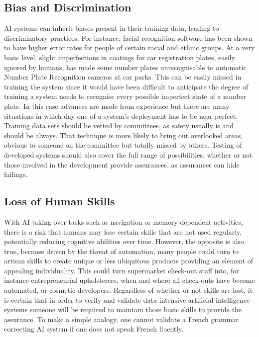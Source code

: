 \subsection{Bias and Discrimination}
AI systems can inherit biases present in their training data, leading to discriminatory practices. For instance, facial recognition software has been shown to have higher error rates for people of certain racial and ethnic groups. At a very basic level, slight imperfections in coatings for car registration plates, easily ignored by humans, has made some number plates unrecognisable to automatic Number Plate Recognition cameras at car parks. This can be easily missed in training the system since it would have been difficult to anticipate the degree of training a system needs to recognise every possible imperfect state of a number plate. In this case advances are made from experience but there are many situations in which day one of a system’s deployment has to be near perfect. Training data sets should be vetted by committees, as safety usually is and should be always. That technique is more likely to bring out overlooked areas, obvious to someone on the committee but totally missed by others. Testing of developed systems should also cover the full range of possibilities, whether or not those involved in the development provide assurances, as assurances can hide failings.

\subsection{Loss of Human Skills}
With AI taking over tasks such as navigation or memory-dependent activities, there is a risk that humans may lose certain skills that are not used regularly, potentially reducing cognitive abilities over time.  However, the opposite is also true, because driven by the threat of automation, many people could turn to artisan skills to create unique or less ubiquitous products providing an element of appealing individuality. This could turn supermarket check-out staff into, for instance entrepreneurial upholsterers, when and where all check-outs have become automated, or cosmetic developers. Regardless of whether or not skills are lost, it is certain that in order to verify and validate data intensive artificial intelligence systems someone will be required to maintain those basic skills to provide the assurance. To make a simple analogy, one cannot validate a French grammar correcting AI system if one does not speak French fluently.

